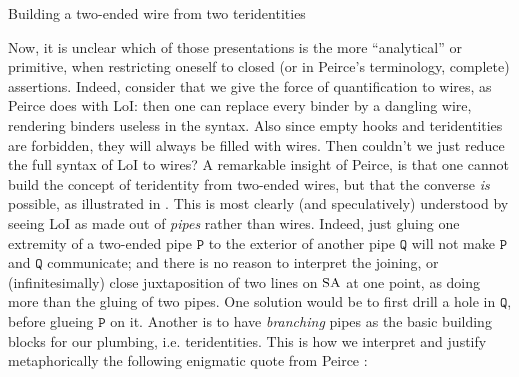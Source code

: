 \begin{marginfigure}
  \begin{center}
  \end{center}
  \caption{Building a two-ended wire from two teridentities}
\end{marginfigure}

Now, it is unclear which of those presentations is the more ``analytical'' or
primitive, when restricting oneself to closed (or in Peirce's terminology,
complete) assertions. Indeed, consider that we give the force of quantification
to wires, as Peirce does with LoI: then one can replace every binder by a
dangling wire, rendering binders useless in the syntax. Also since empty hooks
and teridentities are forbidden, they will always be filled with wires. Then
couldn't we just reduce the full syntax of LoI to wires? A remarkable insight of
Peirce, is that one cannot build the concept of teridentity from two-ended
wires, but that the converse \emph{is} possible, as illustrated in
. This is most clearly (and speculatively) understood
by seeing LoI as made out of \emph{pipes} rather than wires. Indeed, just gluing
one extremity of a two-ended pipe $\mathtt{P}$ to the exterior of another pipe
$\mathtt{Q}$ will not make $\mathtt{P}$ and $\mathtt{Q}$ communicate; and there
is no reason to interpret the joining, or (infinitesimally) close juxtaposition
of two lines on $\small\textsc{SA}$ at one point, as doing more than the gluing of two
pipes. One
solution would be to first drill a hole in $\mathtt{Q}$, before glueing
$\mathtt{P}$ on it. Another is to have \emph{branching} pipes as the basic
building blocks for our plumbing, i.e. teridentities. This is how we interpret
and justify metaphorically the following enigmatic quote from Peirce
\cite[p.~116]{Roberts+1973}:

